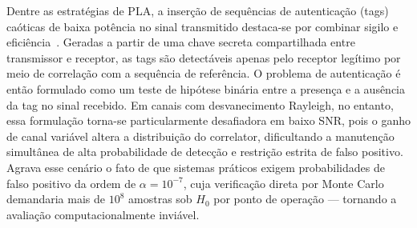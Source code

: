 \documentclass{sbrt}
\begin{document}
Dentre as estratégias de PLA, a inserção de sequências de autenticação (tags) caóticas de baixa potência no sinal transmitido destaca-se por combinar sigilo e eficiência~\cite{ref_joao}. Geradas a partir de uma chave secreta compartilhada entre transmissor e receptor, as tags são detectáveis apenas pelo receptor legítimo por meio de correlação com a sequência de referência. O problema de autenticação é então formulado como um teste de hipótese binária entre a presença e a ausência da tag no sinal recebido. Em canais com desvanecimento Rayleigh, no entanto, essa formulação torna-se particularmente desafiadora em baixo SNR, pois o ganho de canal variável altera a distribuição do correlator, dificultando a manutenção simultânea de alta probabilidade de detecção e restrição estrita de falso positivo. Agrava esse cenário o fato de que sistemas práticos exigem probabilidades de falso positivo da ordem de $\alpha = 10^{-7}$, cuja verificação direta por Monte Carlo demandaria mais de $10^8$ amostras sob $H_0$ por ponto de operação — tornando a avaliação computacionalmente inviável.
\end{document}
